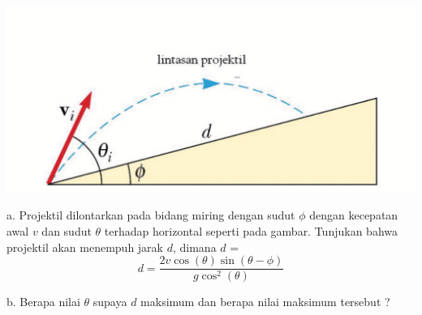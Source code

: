 \mbox{}
\begin{center}
\includegraphics [scale=0.2]{./latex/eps/1_4_1_image_1-eps-converted-to.pdf}
\end{center}a. Projektil dilontarkan pada bidang miring dengan sudut $\phi$ dengan kecepatan awal $v$ dan sudut $\theta$ terhadap horizontal seperti pada gambar. Tunjukan bahwa projektil akan menempuh jarak $d$, dimana $d$ =
\begin{equation*}
        d= \frac{2 v \cos \left(\theta\right) \sin\left(\theta-\phi\right)}{g \cos^2\left(\theta\right)}
\end{equation*}

b. Berapa nilai $\theta$ supaya $d$ maksimum dan berapa nilai maksimum tersebut ?

